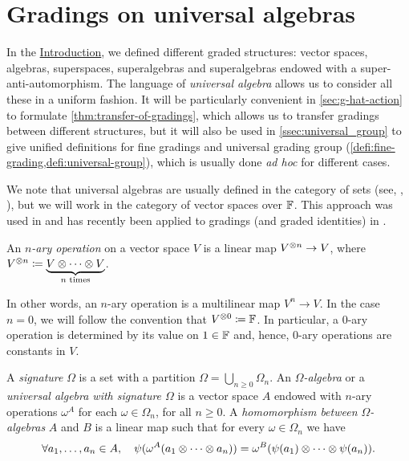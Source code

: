 
\section{Gradings on universal algebras}\label{sec:Omega-algebras}

In the \hyperref[chap:intro]{Introduction}, we defined different graded structures: vector spaces, algebras, superspaces, superalgebras and superalgebras endowed with a super-anti-automorphism. 
The language of \emph{universal algebra} allows us to consider all these in a uniform fashion. 
It will be particularly convenient in \cref{sec:g-hat-action} to formulate \cref{thm:transfer-of-gradings}, which allows us to transfer gradings between different structures, but it will also be used in \cref{ssec:universal_group} to give unified definitions for fine gradings and universal grading group (\cref{defi:fine-grading,defi:universal-group}), which is usually done \emph{ad hoc} for different cases. 

We note that universal algebras are usually defined in the category of sets (see, \eg, \cite{Cohn_universal}), but we will work in the category of vector spaces over $\mathbb{F}$. 
This approach was used in \cite{Razmyslov} and has recently been applied to gradings (and graded identities) in \cite{MR3886336}. 

\begin{defi}
    An \emph{$n$-ary operation} on a vector space $V$ is 
    a linear map $V^{\otimes n} \to V$, where $V^{\otimes n} \coloneqq \underbrace{V\otimes\cdots\otimes V}_{n \text{ times}}$. 
\end{defi}

In other words, an $n$-ary operation is a multilinear map $V^n \to V$. 
In the case $n = 0$, we will follow the convention that $V^{\otimes 0} \coloneqq \mathbb{F}$. 
In particular, a $0$-ary operation is determined by its value on $1 \in \mathbb{F}$ and, hence, $0$-ary operations are constants in $V$. 

\begin{defi}\label{def:universal-algebra}
	A \emph{signature} $\Omega$ is a set with a partition $\Omega = \bigcup_{n \geq 0} \Omega_n$.
	An \emph{$\Omega$-algebra} or a \emph{universal algebra with signature $\Omega$} is a vector space $A$ endowed with $n$-ary operations $\omega^A$ for each $\omega \in \Omega_n$, for all $n \geq 0$. 
	A \emph{homomorphism between $\Omega$-algebras} $A$ and $B$ is a linear map such that for every $\omega \in \Omega_n$ we have
	\[
		\forall a_1, \ldots, a_n \in A, \quad 
		\psi( \omega^A (a_1 \otimes \cdots \otimes a_n) ) = \omega^B ( \psi(a_1) \otimes \cdots \otimes \psi(a_n) ). 
	\]
\end{defi}

